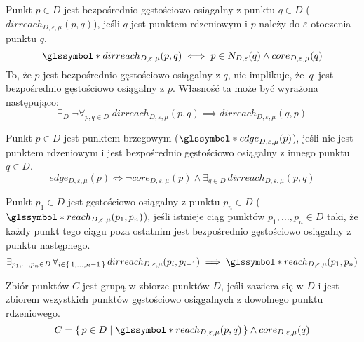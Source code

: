 \newline
Punkt $ p \in D $ jest bezpośrednio gęstościowo osiągalny z punktu $ q \in D $ ($ dirreach_{D,\varepsilon,\mu}(p, q) $), jeśli $ q $ jest punktem rdzeniowym i $ p $ należy do $ \varepsilon $-otoczenia punktu $ q $.
\begin{equation} \label{direct-reachability}
	\s{dirreach}_{D,\varepsilon,\mu}(p, q) \iff p \in N_{D,\varepsilon}(q) \land core_{D,\varepsilon,\mu}(q)
\end{equation}
To, że $ p $ jest bezpośrednio gęstościowo osiągalny z $ q $, nie implikuje, \mbox{że $ q $ jest} bezpośrednio gęstościowo osiągalny z $ p $. Własność ta może być wyrażona następująco:
\begin{equation} \label{direct-reachability-asymmetry}
	\exists_D\;\neg\forall_{p,q\in D}\;dirreach_{D,\varepsilon,\mu}(p, q) \implies dirreach_{D,\varepsilon,\mu}(q, p)
\end{equation}

\newline
Punkt $ p \in D $ jest punktem brzegowym ($ \s{edge}_{D,\varepsilon,\mu}(p) $), jeśli nie jest punktem rdzeniowym i jest bezpośrednio gęstościowo osiągalny z innego \mbox{punktu $ q \in D $}.
\begin{equation}\label{edge-point}
	edge_{D,\varepsilon,\mu}(p) \iff \neg core_{D,\varepsilon,\mu}(p) \land \exists_{q\in D}\, dirreach_{D,\varepsilon,\mu}(p,q)
\end{equation}

\newline
Punkt $ p_1 \in D$ jest gęstościowo osiągalny z punktu $ p_n\in D $ ($ \s{reach}_{D,\varepsilon,\mu}(p_1, p_n) $), jeśli istnieje ciąg punktów $ p_1,\dots,p_n \in D $ taki, że każdy punkt tego ciągu poza ostatnim jest bezpośrednio gęstościowo osiągalny z punktu następnego.
\begin{equation}
	\exists_{p_1,\dots,p_n\in D}\,\forall_{i\in\set{1,\dots,n-1}}\,dirreach_{D,\varepsilon,\mu}(p_i, p_{i+1}) \implies \s{reach}_{D,\varepsilon,\mu}(p_1, p_n)
\end{equation}



\newline
Zbiór punktów $ C $ jest grupą w zbiorze punktów $ D $, jeśli zawiera się w $ D $ i jest zbiorem wszystkich punktów gęstościowo osiągalnych z dowolnego punktu rdzeniowego. 
\begin{equation}\label{eq:cluster-def}
C = \set{p \in D | \s{reach}_{D,\varepsilon,\mu}(p, q)} \land core_{D,\varepsilon,\mu}(q)
\end{equation}

